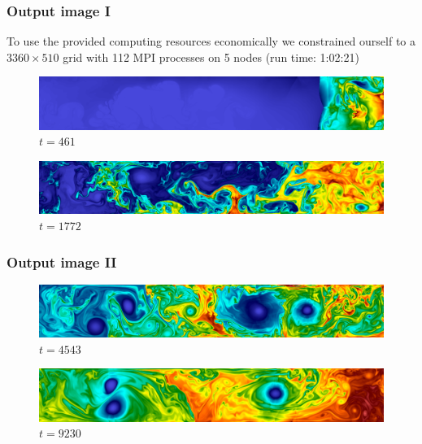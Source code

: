 \documentclass{beamer}
\begin{document}
%
%
%
\begin{frame}
\frametitle{Output image I}
\justify
To use the provided computing resources economically we constrained ourself to a $3360\times510$ grid with 112 MPI processes on 5 nodes (run time: 1:02:21)\\

\vspace{-5mm}
\begin{figure}
\includegraphics[width=12.2cm]{7c.png}
\caption{$t=461$}
\end{figure}

\vspace{-7mm}
\begin{figure}
\includegraphics[width=12.2cm]{10c.png}
\caption{$t=1772$}
\end{figure}



\end{frame}
%
%
%
\begin{frame}
\frametitle{Output image II}

\begin{figure}
\includegraphics[width=12.2cm]{13c.png}
\caption{$t=4543$}
\end{figure}

\begin{figure}
\includegraphics[width=12.2cm]{17c.png}
\caption{$t=9230$}
\end{figure}



\end{frame}

%
%
%
\end{document}

